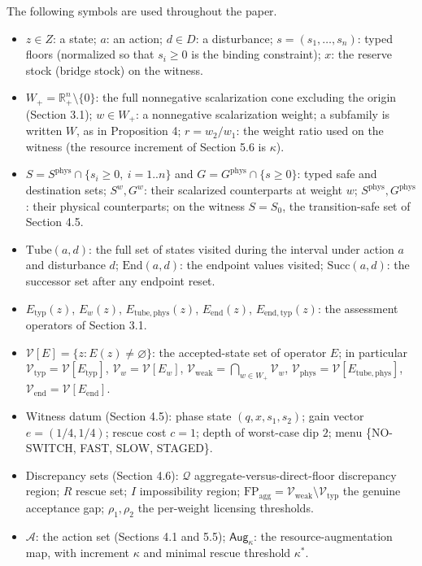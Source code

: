 \documentclass[3p,11pt]{elsarticle}
\providecommand{\tightlist}{\setlength{\itemsep}{0pt}\setlength{\parskip}{0pt}}
\begin{document}
The following symbols are used throughout the paper.

\begin{itemize}
\tightlist
\item
  \(z \in Z\): a state; \(a\): an action; \(d \in D\): a disturbance; \(s = (s_1, \ldots, s_n)\): typed floors (normalized so that \(s_i \ge 0\) is the binding constraint); \(x\): the reserve stock (bridge stock) on the witness.
\item
  \(W_+ = \mathbb{R}^n_+ \setminus \{0\}\): the full nonnegative scalarization cone excluding the origin (Section 3.1); \(w \in W_+\): a nonnegative scalarization weight; a subfamily is written \(W\), as in Proposition 4; \(r = w_2 / w_1\): the weight ratio used on the witness (the resource increment of Section 5.6 is \(\kappa\)).
\item
  \(S = S^{\mathrm{phys}} \cap \{ s_i \ge 0,\ i = 1..n \}\) and \(G = G^{\mathrm{phys}} \cap \{ s \ge 0 \}\): typed safe and destination sets; \(S^w, G^w\): their scalarized counterparts at weight \(w\); \(S^{\mathrm{phys}}, G^{\mathrm{phys}}\): their physical counterparts; on the witness \(S = S_0\), the transition-safe set of Section 4.5.
\item
  \(\mathrm{Tube}(a,d)\): the full set of states visited during the interval under action \(a\) and disturbance \(d\); \(\mathrm{End}(a,d)\): the endpoint values visited; \(\mathrm{Succ}(a,d)\): the successor set after any endpoint reset.
\item
  \(E_{\mathrm{typ}}(z)\), \(E_w(z)\), \(E_{\mathrm{tube,phys}}(z)\), \(E_{\mathrm{end}}(z)\), \(E_{\mathrm{end,typ}}(z)\): the assessment operators of Section 3.1.
\item
  \(\mathcal{V}[E] = \{ z : E(z) \neq \varnothing \}\): the accepted-state set of operator \(E\); in particular \(\mathcal{V}_{\mathrm{typ}} = \mathcal{V}[E_{\mathrm{typ}}]\), \(\mathcal{V}_w = \mathcal{V}[E_w]\), \(\mathcal{V}_{\mathrm{weak}} = \bigcap_{w \in W_+} \mathcal{V}_w\), \(\mathcal{V}_{\mathrm{phys}} = \mathcal{V}[E_{\mathrm{tube,phys}}]\), \(\mathcal{V}_{\mathrm{end}} = \mathcal{V}[E_{\mathrm{end}}]\).
\item
  Witness datum (Section 4.5): phase state \((q, x, s_1, s_2)\); gain vector \(e = (1/4, 1/4)\); rescue cost \(c = 1\); depth of worst-case dip \(2\); menu \{NO-SWITCH, FAST, SLOW, STAGED\}.
\item
  Discrepancy sets (Section 4.6): \(\mathcal{Q}\) aggregate-versus-direct-floor discrepancy region; \(R\) rescue set; \(I\) impossibility region; \(\mathrm{FP}_{\mathrm{agg}} = \mathcal{V}_{\mathrm{weak}} \setminus \mathcal{V}_{\mathrm{typ}}\) the genuine acceptance gap; \(\rho_1, \rho_2\) the per-weight licensing thresholds.
\item
  \(\mathcal{A}\): the action set (Sections 4.1 and 5.5); \(\mathsf{Aug}_\kappa\): the resource-augmentation map, with increment \(\kappa\) and minimal rescue threshold \(\kappa^*\).
\end{itemize}
\end{document}

